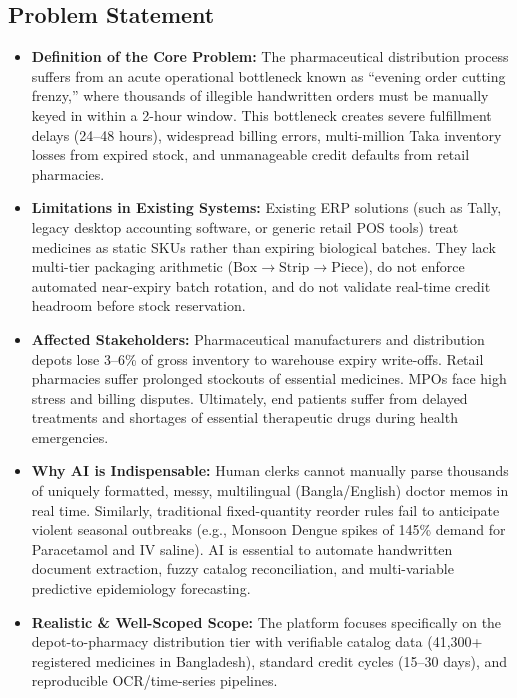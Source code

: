 \documentclass[12pt,a4paper]{article}
\begin{document}
\subsection{Problem Statement}
\begin{itemize}
    \item \textbf{Definition of the Core Problem:} The pharmaceutical distribution process suffers from an acute operational bottleneck known as ``evening order cutting frenzy,'' where thousands of illegible handwritten orders must be manually keyed in within a 2-hour window. This bottleneck creates severe fulfillment delays (24--48 hours), widespread billing errors, multi-million Taka inventory losses from expired stock, and unmanageable credit defaults from retail pharmacies.
    \item \textbf{Limitations in Existing Systems:} Existing ERP solutions (such as Tally, legacy desktop accounting software, or generic retail POS tools) treat medicines as static SKUs rather than expiring biological batches. They lack multi-tier packaging arithmetic ($\text{Box} \to \text{Strip} \to \text{Piece}$), do not enforce automated near-expiry batch rotation, and do not validate real-time credit headroom before stock reservation.
    \item \textbf{Affected Stakeholders:} Pharmaceutical manufacturers and distribution depots lose 3--6\% of gross inventory to warehouse expiry write-offs. Retail pharmacies suffer prolonged stockouts of essential medicines. MPOs face high stress and billing disputes. Ultimately, end patients suffer from delayed treatments and shortages of essential therapeutic drugs during health emergencies.
    \item \textbf{Why AI is Indispensable:} Human clerks cannot manually parse thousands of uniquely formatted, messy, multilingual (Bangla/English) doctor memos in real time. Similarly, traditional fixed-quantity reorder rules fail to anticipate violent seasonal outbreaks (e.g., Monsoon Dengue spikes of 145\% demand for Paracetamol and IV saline). AI is essential to automate handwritten document extraction, fuzzy catalog reconciliation, and multi-variable predictive epidemiology forecasting.
    \item \textbf{Realistic \& Well-Scoped Scope:} The platform focuses specifically on the depot-to-pharmacy distribution tier with verifiable catalog data (41,300+ registered medicines in Bangladesh), standard credit cycles (15--30 days), and reproducible OCR/time-series pipelines.
\end{itemize}
\end{document}
